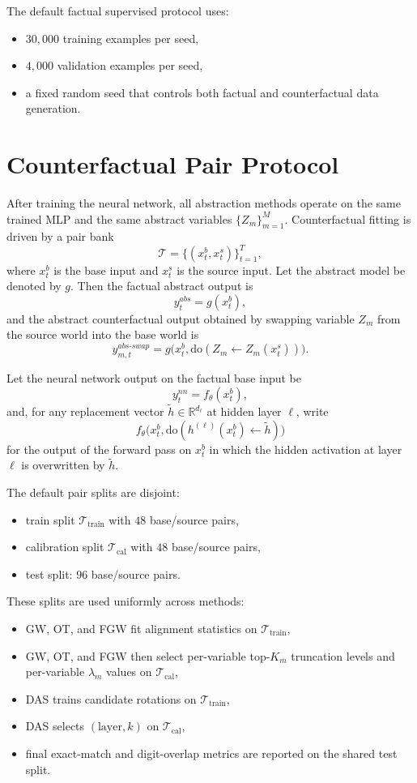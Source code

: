 \documentclass[11pt]{article}
\newcommand{\R}{\mathbb{R}}
\begin{document}
The default factual supervised protocol uses:
\begin{itemize}[leftmargin=1.5em]
\item $30{,}000$ training examples per seed,
\item $4{,}000$ validation examples per seed,
\item a fixed random seed that controls both factual and counterfactual data generation.
\end{itemize}

\section{Counterfactual Pair Protocol}
After training the neural network, all abstraction methods operate on the same trained MLP and the same abstract variables $\{Z_m\}_{m=1}^M$. Counterfactual fitting is driven by a pair bank
\[
\mathcal{T} = \{(x_t^{b}, x_t^{s})\}_{t=1}^{T},
\]
where $x_t^{b}$ is the base input and $x_t^{s}$ is the source input. Let the abstract model be denoted by $g$. Then the factual abstract output is
\[
y_{t}^{abs} = g(x_t^{b}),
\]
and the abstract counterfactual output obtained by swapping variable $Z_m$ from the source world into the base world is
\[
y_{m,t}^{abs\text{-}swap}
=
g\!\bigl(x_t^{b}, \mathrm{do}(Z_m \leftarrow Z_m(x_t^{s}))\bigr).
\]

Let the neural network output on the factual base input be
\[
y_t^{nn} = f_\theta(x_t^{b}),
\]
and, for any replacement vector $\widetilde h \in \R^{d_\ell}$ at hidden layer $\ell$, write
\[
f_\theta\!\bigl(x_t^{b}, \mathrm{do}(h^{(\ell)}(x_t^b) \leftarrow \widetilde h)\bigr)
\]
for the output of the forward pass on $x_t^{b}$ in which the hidden activation at layer $\ell$ is overwritten by $\widetilde h$.

The default pair splits are disjoint:
\begin{itemize}[leftmargin=1.5em]
\item train split $\mathcal{T}_{\mathrm{train}}$ with $48$ base/source pairs,
\item calibration split $\mathcal{T}_{\mathrm{cal}}$ with $48$ base/source pairs,
\item test split: $96$ base/source pairs.
\end{itemize}

These splits are used uniformly across methods:
\begin{itemize}[leftmargin=1.5em]
\item GW, OT, and FGW fit alignment statistics on $\mathcal{T}_{\mathrm{train}}$,
\item GW, OT, and FGW then select per-variable top-$K_m$ truncation levels and per-variable $\lambda_m$ values on $\mathcal{T}_{\mathrm{cal}}$,
\item DAS trains candidate rotations on $\mathcal{T}_{\mathrm{train}}$,
\item DAS selects $(\text{layer}, k)$ on $\mathcal{T}_{\mathrm{cal}}$,
\item final exact-match and digit-overlap metrics are reported on the shared test split.
\end{itemize}
\end{document}
